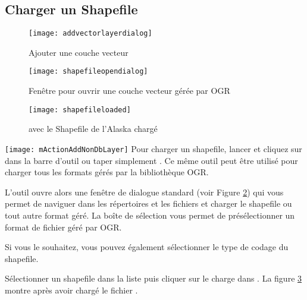 \subsection{Charger un Shapefile}\label{sec:load_shapefile}

\begin{figure}[ht]
   \begin{center}  
   \texttt{[image: addvectorlayerdialog]}
   \caption{Ajouter une couche vecteur \nixcaption}\label{fig:addvectorlayer}
\end{center} 
\end{figure}

\begin{figure}[ht]
  \begin{center} 
  \texttt{[image: shapefileopendialog]}
  \caption{Fenêtre pour ouvrir une couche vecteur gérée par OGR \nixcaption}\label{fig:openshapefile}
\end{center}
\end{figure}

\begin{figure}[ht]
  \begin{center}
  \texttt{[image: shapefileloaded]}
    \caption{\qg avec le Shapefile de l'Alaska chargé \nixcaption}\label{fig:loadedshapefile}
\end{center}
\end{figure}

\texttt{[image: mActionAddNonDbLayer]} Pour charger un shapefile, lancer \qg et cliquez sur  dans la barre d'outil ou taper simplement . Ce même outil peut être utilisé pour charger tous les formats gérés par la bibliothèque OGR.
\par
L'outil ouvre alors une fenêtre de dialogue standard (voir Figure \ref{fig:openshapefile}) qui vous permet de naviguer dans les répertoires et les fichiers et charger le shapefile ou tout autre format géré.
La boîte de sélection  vous permet de présélectionner un format de fichier géré par OGR.
\par
Si vous le souhaitez, vous pouvez également sélectionner le type de codage du shapefile.
\par
Sélectionner un shapefile dans la liste puis cliquer sur  le charge dans \qg. La figure \ref{fig:loadedshapefile} montre \qg après avoir chargé le fichier .

